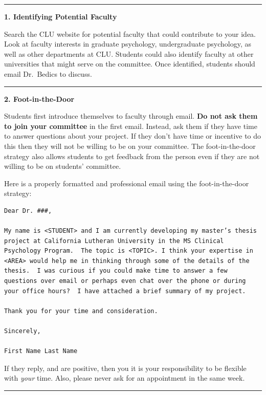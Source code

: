 \documentclass[openany]{book}
\begin{document}
\begin{center}\rule{0.5\linewidth}{0.5pt}\end{center}

\textbf{1. Identifying Potential Faculty}

Search the CLU website for potential faculty that could contribute to your idea. Look at faculty interests in graduate psychology, undergraduate psychology, as well as other departments at CLU. Students could also identify faculty at other universities that might serve on the committee. Once identified, students should email Dr.~Bedics to discuss.

\begin{center}\rule{0.5\linewidth}{0.5pt}\end{center}

\textbf{2. Foot-in-the-Door}

Students first introduce themselves to faculty through email. \textbf{Do not ask them to join your committee} in the first email. Instead, ask them if they have time to answer questions about your project. If they don't have time or incentive to do this then they will not be willing to be on your committee. The foot-in-the-door strategy also allows students to get feedback from the person even if they are not willing to be on students' committee.

Here is a properly formatted and professional email using the foot-in-the-door strategy:

\begin{verbatim}
Dear Dr. ###,

My name is <STUDENT> and I am currently developing my master’s thesis project at California Lutheran University in the MS Clinical Psychology Program.  The topic is <TOPIC>. I think your expertise in <AREA> would help me in thinking through some of the details of the thesis.  I was curious if you could make time to answer a few questions over email or perhaps even chat over the phone or during your office hours?  I have attached a brief summary of my project.

Thank you for your time and consideration.

Sincerely,

First Name Last Name
\end{verbatim}

If they reply, and are positive, then you it is your responsibility to be flexible with \emph{your} time. Also, please never ask for an appointment in the same week.

\begin{center}\rule{0.5\linewidth}{0.5pt}\end{center}
\end{document}
